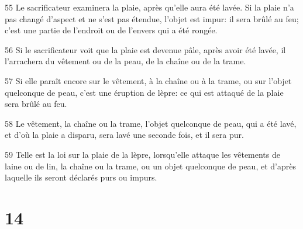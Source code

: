 \par 55 Le sacrificateur examinera la plaie, après qu'elle aura été lavée. Si la plaie n'a pas changé d'aspect et ne s'est pas étendue, l'objet est impur: il sera brûlé au feu; c'est une partie de l'endroit ou de l'envers qui a été rongée.
\par 56 Si le sacrificateur voit que la plaie est devenue pâle, après avoir été lavée, il l'arrachera du vêtement ou de la peau, de la chaîne ou de la trame.
\par 57 Si elle paraît encore sur le vêtement, à la chaîne ou à la trame, ou sur l'objet quelconque de peau, c'est une éruption de lèpre: ce qui est attaqué de la plaie sera brûlé au feu.
\par 58 Le vêtement, la chaîne ou la trame, l'objet quelconque de peau, qui a été lavé, et d'où la plaie a disparu, sera lavé une seconde fois, et il sera pur.
\par 59 Telle est la loi sur la plaie de la lèpre, lorsqu'elle attaque les vêtements de laine ou de lin, la chaîne ou la trame, ou un objet quelconque de peau, et d'après laquelle ils seront déclarés purs ou impurs.

\chapter{14}

